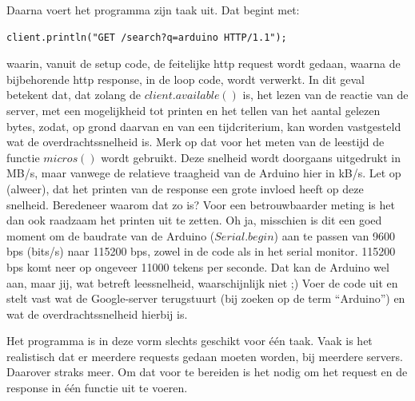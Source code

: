 Daarna voert het programma zijn taak uit. Dat begint met:
\begin{lstlisting}[language=Arduino, numbers=none]
client.println("GET /search?q=arduino HTTP/1.1");
\end{lstlisting}

waarin, vanuit de setup code, de feitelijke http request wordt gedaan, waarna de bijbehorende http response, in de loop code, wordt verwerkt. In dit geval betekent dat, dat zolang de $client.available()$ is, het lezen van de reactie van de server, met een mogelijkheid tot printen en het tellen van het aantal gelezen bytes, zodat, op grond daarvan en van een tijdcriterium, kan worden vastgesteld wat de overdrachtssnelheid is. Merk op dat voor het meten van de leestijd de functie $micros()$ wordt gebruikt. Deze snelheid wordt doorgaans uitgedrukt in MB/s, maar vanwege de relatieve traagheid van de Arduino hier in kB/s. Let op (alweer), dat het printen van de response een grote invloed heeft op deze snelheid. Beredeneer waarom dat zo is? Voor een betrouwbaarder meting is het dan ook raadzaam het printen uit te zetten.
Oh ja, misschien is dit een goed moment om de baudrate van de Arduino ($Serial.begin$) aan te passen van 9600 bps (bits/s) naar 115200 bps, zowel in de code als in het serial monitor. 115200 bps komt neer op ongeveer 11000 tekens per seconde. Dat kan de Arduino wel aan, maar jij, wat betreft leessnelheid, waarschijnlijk niet ;)
Voer de code uit en stelt vast wat de Google-server terugstuurt (bij zoeken op de term “Arduino”) en wat de overdrachtssnelheid hierbij is. 

Het programma is in deze vorm slechts geschikt voor één taak. Vaak is het realistisch dat er meerdere requests gedaan moeten worden, bij meerdere servers. Daarover straks meer. Om dat voor te bereiden is het nodig om het request en de response in één functie uit te voeren.

